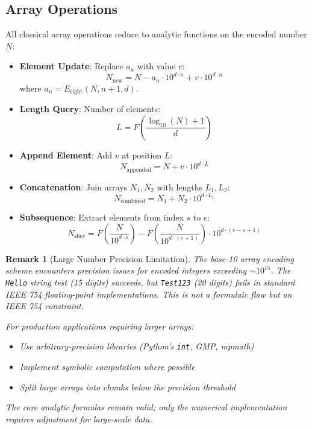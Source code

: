 \documentclass[12pt, a4paper]{article}
\theoremstyle{note}
\newtheorem{remark}{Remark}[section]
\begin{document}
\subsection{Array Operations}

All classical array operations reduce to analytic functions on the encoded number $N$:

\begin{itemize}
    \item \textbf{Element Update}: Replace $a_n$ with value $v$:
    \[
    N_{\text{new}} = N - a_n \cdot 10^{d \cdot n} + v \cdot 10^{d \cdot n}
    \]
    where $a_n = E_{\text{right}}(N, n+1, d)$.

    \item \textbf{Length Query}: Number of elements:
    \[
    L = F\!\left(\frac{\log_{10}(N) + 1}{d}\right)
    \]

    \item \textbf{Append Element}: Add $v$ at position $L$:
    \[
    N_{\text{appended}} = N + v \cdot 10^{d \cdot L}
    \]

    \item \textbf{Concatenation}: Join arrays $N_1, N_2$ with lengths $L_1, L_2$:
    \[
    N_{\text{combined}} = N_1 + N_2 \cdot 10^{d \cdot L_1}
    \]

    \item \textbf{Subsequence}: Extract elements from index $s$ to $e$:
    \[
    N_{\text{slice}} = F\!\left(\frac{N}{10^{d \cdot s}}\right) - F\!\left(\frac{N}{10^{d \cdot (e+1)}}\right) \cdot 10^{d \cdot (e - s + 1)}
    \]
\end{itemize}

\begin{remark}[Large Number Precision Limitation]\label{rem:large_number_limit}
The base-10 array encoding scheme encounters precision issues for encoded integers exceeding \(\sim 10^{15}\). The \texttt{Hello} string test (15 digits) succeeds, but \texttt{Test123} (20 digits) fails in standard IEEE 754 floating-point implementations. This is not a formulaic flaw but an IEEE 754 constraint.

For production applications requiring larger arrays:
\begin{itemize}
    \item Use arbitrary-precision libraries (Python's \texttt{int}, GMP, mpmath)
    \item Implement symbolic computation where possible
    \item Split large arrays into chunks below the precision threshold
\end{itemize}
The core analytic formulas remain valid; only the numerical implementation requires adjustment for large-scale data.
\end{remark}
\end{document}
